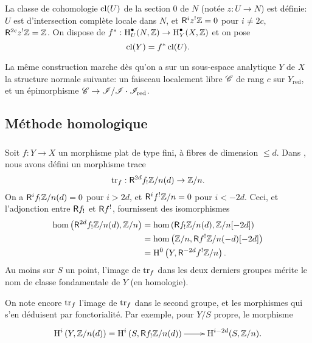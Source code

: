 La classe de cohomologie $\operatorname{cl}(U)$ de la section $0$ de $N$ (notée $z:U\to N$) 
est définie: $U$ est d'intersection complète locale dans $N$, et 
$\mathsf{R}^i z^!\mathbb{Z} = 0$ pour $i\ne 2 c$, $\mathsf{R}^{2 c} z^!\mathbb{Z} = \mathbb{Z}$. On dispose de 
$f^*:\operatorname{H}_U^\bullet(N,\mathbb{Z}) \to \operatorname{H}_Y^\bullet(X,\mathbb{Z})$ et on pose 
\[
  \operatorname{cl}(Y) = f^*\operatorname{cl}(U) \text{.}
\]

La même construction marche dès qu'on a sur un sous-espace analytique $Y$ 
de $X$ la structure normale suivante: un faisceau localement libre $\mathscr{C}$ de 
rang $c$ sur $Y_\text{red}$, et un épimorphisme 
$\mathscr{C}\to \mathscr{I}/\mathscr{I}\cdot \mathscr{I}_\text{red}$. 










\subsection{Méthode homologique}\label{IV:2-3}





\subsubsection{}\label{IV:2-3-1}

Soit $f:Y\to X$ un morphisme plat de type fini, à fibres de dimension 
$\leqslant d$. Dans \cite[XVIII 2.9]{sga4}, nous avons défini un morphisme 
trace 
\begin{equation}\label{IV:eq:2-3-1-1}
  \operatorname{tr}_f:\mathsf{R}^{2 d} f_! \mathbb{Z}/n(d) \to \mathbb{Z}/n \text{.}
\end{equation}
On a $\mathsf{R}^i f_!\mathbb{Z}/n(d)=0$ pour $i>2 d$, et $\mathsf{R}^i f^!\mathbb{Z}/n=0$ pour $i<-2 d$. 
Ceci, et l'adjonction entre $\mathsf{R} f_!$ et $\mathsf{R} f^!$, fournissent des isomorphismes 
\begin{equation}\label{IV:eq:2-1-3-2}
\begin{aligned}
  \hom\left(\mathsf{R}^{2 d}f_!\mathbb{Z}/n(d),\mathbb{Z}/n\right) 
    &= \hom\left(\mathsf{R} f_!\mathbb{Z}/n(d),\mathbb{Z}/n[-2 d]\right) \\
    &= \hom\left(\mathbb{Z}/n,\mathsf{R} f^!\mathbb{Z}/n(-d)[-2 d]\right) \\
    &= \operatorname{H}^0\left(Y,\mathsf{R}^{-2 d}f^!\mathbb{Z}/n\right) \text{.}
\end{aligned}
\end{equation}
Au moins sur $S$ un point, l'image de $\operatorname{tr}_f$ dans les deux derniers groupes 
mérite le nom de classe fondamentale de $Y$ (en homologie). 

On note encore $\operatorname{tr}_f$ l'image de $\operatorname{tr}_f$ dans le second groupe, et les 
morphismes qui s'en déduisent par fonctorialité. Par exemple, pour $Y/S$ 
propre, le morphisme 
\begin{equation}\label{IV:eq:2-3-1-3}
\xymatrix{
  \h^i\left(Y,\dZ/n(d)\right) = \h^i\left(S,\R f_!\dZ/n(d)\right) \ar[r] 
    & \h^{i-2 d}(S,\dZ/n) \text{.}
}
\end{equation}

